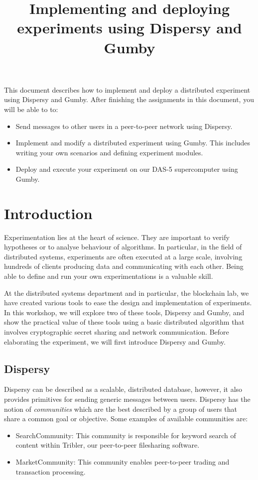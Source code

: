\documentclass{article}
\title{Implementing and deploying experiments using Dispersy and Gumby}
\begin{document}
\maketitle

This document describes how to implement and deploy a distributed experiment using Dispersy and Gumby.
After finishing the assignments in this document, you will be able to to:
\begin{itemize}
	\item Send messages to other users in a peer-to-peer network using Dispersy.
	\item Implement and modify a distributed experiment using Gumby. This includes writing your own scenarios and defining experiment modules.
	\item Deploy and execute your experiment on our DAS-5 supercomputer using Gumby.
\end{itemize}

\section{Introduction}
Experimentation lies at the heart of science. They are important to verify hypotheses or to analyse behaviour of algorithms.
In particular, in the field of distributed systems, experiments are often executed at a large scale, involving hundreds of clients producing data and communicating with each other.
Being able to define and run your own experimentations is a valuable skill.

At the distributed systems department and in particular, the blockchain lab, we have created various tools to ease the design and implementation of experiments. In this workshop, we will explore two of these tools, Dispersy and Gumby, and show the practical value of these tools using a basic distributed algorithm that involves cryptographic secret sharing and network communication.
Before elaborating the experiment, we will first introduce Dispersy and Gumby.

\subsection{Dispersy}
Dispersy can be described as a scalable, distributed database, however, it also provides primitives for sending generic messages between users.
Dispersy has the notion of \emph{communities} which are the best described by a group of users that share a common goal or objective.
Some examples of available communities are:
\begin{itemize}
	\item SearchCommunity: This community is responsible for keyword search of content within Tribler, our peer-to-peer filesharing software.
	\item MarketCommunity: This community enables peer-to-peer trading and transaction processing.
\end{itemize}
\end{document}
